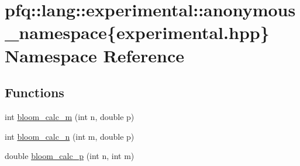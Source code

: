 \hypertarget{namespacepfq_1_1lang_1_1experimental_1_1anonymous__namespace_02experimental_8hpp_03}{\section{pfq\+:\+:lang\+:\+:experimental\+:\+:anonymous\+\_\+namespace\{experimental.\+hpp\} Namespace Reference}
\label{namespacepfq_1_1lang_1_1experimental_1_1anonymous__namespace_02experimental_8hpp_03}
}
\subsection*{Functions}
\begin{DoxyCompactItemize}
\item 
int \hyperlink{namespacepfq_1_1lang_1_1experimental_1_1anonymous__namespace_02experimental_8hpp_03_a66ae92e73a9138c6811edf5d3ea4dcbb}{bloom\+\_\+calc\+\_\+m} (int n, double p)
\item 
int \hyperlink{namespacepfq_1_1lang_1_1experimental_1_1anonymous__namespace_02experimental_8hpp_03_aa52a0cd9204c35eea2cfa55aee4be2bc}{bloom\+\_\+calc\+\_\+n} (int m, double p)
\item 
double \hyperlink{namespacepfq_1_1lang_1_1experimental_1_1anonymous__namespace_02experimental_8hpp_03_ac255f8a59370cdc2ad11d76340b6bbbf}{bloom\+\_\+calc\+\_\+p} (int n, int m)
\end{DoxyCompactItemize}
